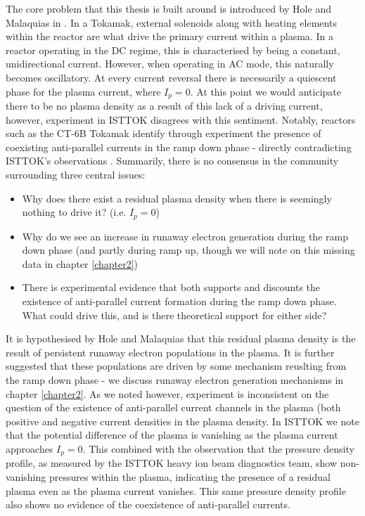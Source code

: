 The core problem that this thesis is built around is introduced by Hole and Malaquias in \cite{malaquias-matthew}.
In a Tokamak, external solenoids along with heating elements within the reactor are 
what drive the primary current within a plasma. In a reactor operating in the DC regime, this is 
characterised by being a constant, unidirectional current. However, when operating in AC mode, 
this naturally becomes oscillatory. At every current reversal there is necessarily a quiescent phase 
for the plasma current, where $I_{p} = 0$. At this point we would anticipate there to be no plasma density 
as a result of this lack of a driving current, however, experiment in ISTTOK disagrees with this sentiment. 
Notably, reactors such as the CT-6B Tokamak identify through experiment the presence of coexisting anti-parallel 
currents in the ramp down phase - directly contradicting ISTTOK's observations \cite{huang-ct-tokamak}. 
Summarily, there is no consensus in the community surrounding three central issues:
\begin{itemize}
    \item Why does there exist a residual plasma density when there is seemingly nothing to drive it? (i.e. $I_p = 0$)
    \item Why do we see an increase in runaway electron generation during the ramp down phase (and partly during 
    ramp up, though we will note on this missing data in chapter \ref{chapter2})
    \item There is experimental evidence that both supports and discounts the existence of anti-parallel current
    formation during the ramp down phase. What could drive this, and is there theoretical support for either side?
\end{itemize}

It is hypothesised by Hole and Malaquias that this residual plasma density is the result of 
persistent runaway electron populations in the plasma. It is further suggested that these populations
are driven by some mechanism reuslting from the ramp down phase - we discuss runaway electron generation 
mechanisms in chapter \ref{chapter2}. As we noted however, experiment is inconsistent on the question of 
the existence of anti-parallel current channels in the plasma (both positive and negative current densities 
in the plasma density. In ISTTOK we note that the potential difference of the plasma is vanishing as the plasma 
current approaches $I_p = 0$. This combined with the observation that the pressure density profile, as measured 
by the ISTTOK heavy ion beam diagnostics team, show non-vanishing pressures within the plasma, indicating 
the presence of a residual plasma even as the plasma current vanishes. This same pressure density profile 
also shows no evidence of the coexistence of anti-parallel currents.

